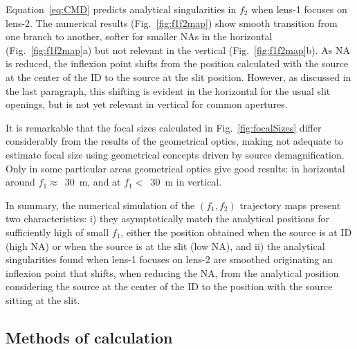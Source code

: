 \documentclass{iucr}              %
\begin{document}
Equation~\ref{eq:CMD} predicts analytical singularities in $f_2$ when lens-1 focuses on lens-2. The numerical results (Fig.~\ref{fig:f1f2map}) show smooth transition from one branch to another, softer for smaller NAs in the horizontal (Fig.~\ref{fig:f1f2map}a) but not relevant in the vertical (Fig.~\ref{fig:f1f2map}b). As NA is reduced, the inflexion point shifts from the position calculated with the source at the center of the ID to the source at the slit position. However, as discussed in the last paragraph, this shifting is evident in the horizontal for the usual slit openings, but is not yet relevant in vertical for common apertures. 

It is remarkable that the focal sizes calculated in Fig.~\ref{fig:focalSizes} differ considerably from the results of the geometrical optics, making not adequate to estimate focal size using geometrical concepts driven by source demagnification. Only in some particular areas geometrical optics give good results: in horizontal around $f_1\approx$~\SI{30}{\meter}, and at  $f_1 <$~\SI{30}{\meter} in vertical. 

In summary, the numerical simulation of the $(f_1,f_2)$ trajectory maps present two characteristics: i) they asymptotically match the analytical positions for sufficiently high of small $f_1$, either the position obtained when the source is at ID (high NA) or when the source is at the slit (low NA), and ii) the analytical singularities found when lens-1 focuses on lens-2 are smoothed originating an inflexion point that shifts, when reducing the NA, from the analytical position considering the source at the center of the ID to the position with the source sitting at the slit.   
 

\subsection{Methods of calculation}
\end{document}
